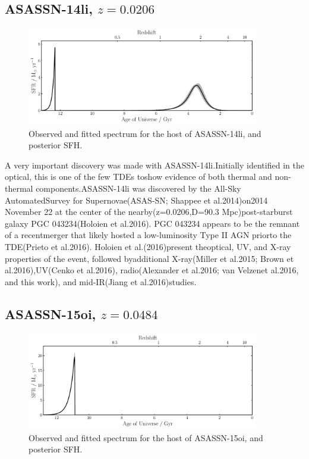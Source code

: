 \documentclass[a4paper,11pt]{article}
\begin{document}
\subsection{ASASSN-14li, $z=0.0206$}\label{sec:ASASSN-14li}
\begin{figure}[h!]
\centering
  \includegraphics[width=0.9\textwidth]{../pipes/plots/r4_dblplaw_burst/ASASSN14li_sfh.pdf}
  \caption{Observed and fitted spectrum for the host of ASASSN-14li, and posterior SFH.}
  \label{}
\end{figure}

A very important discovery was made with ASASSN-14li.Initially identified in the optical, this is one of the few TDEs toshow evidence of both thermal and non-thermal components.ASASSN-14li was discovered by the All-Sky AutomatedSurvey for Supernovae(ASAS-SN; Shappee et al.2014)on2014 November 22 at the center of the nearby(z=0.0206,D=90.3 Mpc)post-starburst galaxy PGC 043234(Holoien et al.2016). PGC 043234 appears to be the remnant of a recentmerger that likely hosted a low-luminosity Type II AGN priorto the TDE(Prieto et al.2016). Holoien et al.(2016)present theoptical, UV, and X-ray properties of the event, followed byadditional X-ray(Miller et al.2015; Brown et al.2016),UV(Cenko et al.2016), radio(Alexander et al.2016; van Velzenet al.2016, and this work), and mid-IR(Jiang et al.2016)studies.\cite{Romero_Canizales_2016}


\newpage
\subsection{ASASSN-15oi, $z=0.0484$}\label{sec:ASASSN-15oi}
\begin{figure}[h!]
\centering
  \includegraphics[width=0.9\textwidth]{../pipes/plots/r4_dblplaw_burst/ASASSN15oi_sfh.pdf}
  \caption{Observed and fitted spectrum for the host of ASASSN-15oi, and posterior SFH.}
  \label{}
\end{figure}
\end{document}
